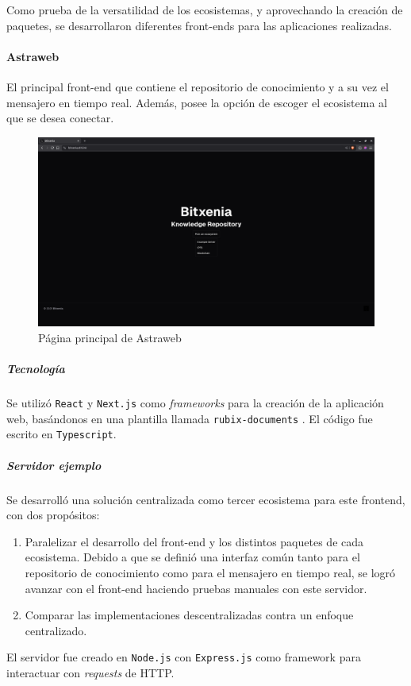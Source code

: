 Como prueba de la versatilidad de los ecosistemas, y aprovechando la creación de paquetes, se desarrollaron diferentes front-ends para las aplicaciones realizadas.

\paragraph{Astraweb}

El principal front-end que contiene el repositorio de conocimiento y a su vez el mensajero en tiempo real. Además, posee la opción de escoger el ecosistema al que se desea conectar.

\begin{figure}[H]
    \centering
    \includegraphics[width=1\linewidth]{img/astraweb-main-page.png}
    \caption{Página principal de Astraweb}
    \label{fig:astraweb-main-page}
\end{figure}

\subparagraph{Tecnología} Se utilizó \texttt{React} \cite{react} y \texttt{Next.js} \cite{next} como \textit{frameworks} para la creación de la aplicación web, basándonos en una plantilla llamada \texttt{rubix-documents} \cite{rubix}. El código fue escrito en \texttt{Typescript}.

\subparagraph{Servidor ejemplo} Se desarrolló una solución centralizada como tercer ecosistema para este frontend, con dos propósitos:
\begin{enumerate}
    \item Paralelizar el desarrollo del front-end y los distintos paquetes de cada ecosistema. Debido a que se definió una interfaz común tanto para el repositorio de conocimiento como para el mensajero en tiempo real, se logró avanzar con el front-end haciendo pruebas manuales con este servidor.
    \item Comparar las implementaciones descentralizadas contra un enfoque centralizado.
\end{enumerate}
El servidor fue creado en \texttt{Node.js} con \texttt{Express.js} como framework para interactuar con \textit{requests} de HTTP.

